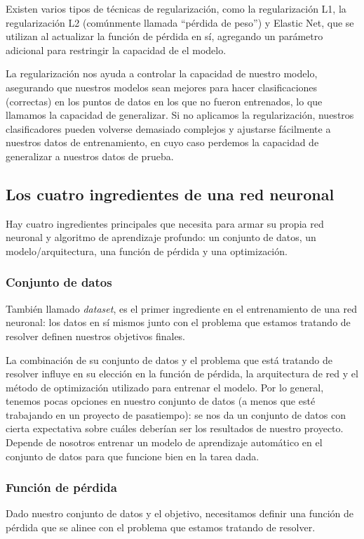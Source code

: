 \documentclass[a4paper,12pt]{article}
\begin{document}
Existen varios tipos de técnicas de regularización, como la regularización L1, la regularización L2 (comúnmente llamada “pérdida de peso”) y Elastic Net, que se utilizan al actualizar la función de pérdida en sí, agregando un parámetro adicional para restringir la capacidad de el modelo.

La regularización nos ayuda a controlar la capacidad de nuestro modelo, asegurando que nuestros modelos sean mejores para hacer clasificaciones (correctas) en los puntos de datos en los que no fueron entrenados, lo que llamamos la capacidad de generalizar. Si no aplicamos la regularización, nuestros clasificadores pueden volverse demasiado complejos y ajustarse fácilmente a nuestros datos de entrenamiento, en cuyo caso perdemos la capacidad de generalizar a nuestros datos de prueba.

\subsection{Los cuatro ingredientes de una red neuronal}
Hay cuatro ingredientes principales \citep{rosebrock2017deep} que necesita para armar su propia red neuronal y algoritmo de aprendizaje profundo: un conjunto de datos, un modelo/arquitectura, una función de pérdida y una optimización.
\subsubsection{Conjunto de datos}
También llamado \textit{dataset}, es el primer ingrediente en el entrenamiento de una red neuronal: los datos en sí mismos junto con el problema que estamos tratando de resolver definen nuestros objetivos finales.

La combinación de su conjunto de datos y el problema que está tratando de resolver influye en su elección en la función de pérdida, la arquitectura de red y el método de optimización utilizado para entrenar el modelo. Por lo general, tenemos pocas opciones en nuestro conjunto de datos (a menos que esté trabajando en un proyecto de pasatiempo): se nos da un conjunto de datos con cierta expectativa sobre cuáles deberían ser los resultados de nuestro proyecto. Depende de nosotros entrenar un modelo de aprendizaje automático en el conjunto de datos para que funcione bien en la tarea dada.

\subsubsection{Función de pérdida}
Dado nuestro conjunto de datos y el objetivo, necesitamos definir una función de pérdida que se alinee con el problema que estamos tratando de resolver.
\end{document}
